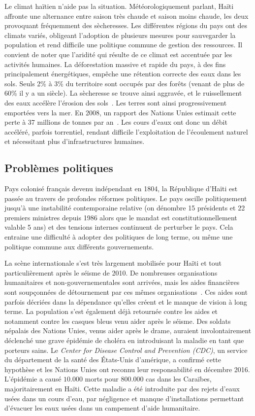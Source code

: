 \documentclass{eplmastersthesis_FR}
\begin{document}
				Le climat haïtien n'aide pas la situation. Météorologiquement parlant, Haïti affronte une alternance entre saison très chaude et saison moins chaude, les deux provoquant fréquemment des sècheresses. Les différentes régions du pays ont des climats variés, obligeant l'adoption de plusieurs mesures pour sauvegarder la population et rend difficile une politique commune de gestion des ressources. Il convient de noter que l'aridité qui résulte de ce climat est accentuée par les activités humaines. La déforestation massive et rapide du pays, à des fins principalement énergétiques, empêche une rétention correcte des eaux dans les sols. Seuls 2\% à 3\% du territoire sont occupés par des forêts (venant de plus de 60\% il y a un siècle). La sècheresse se trouve ainsi aggravée, et le ruissellement des eaux accélère l'érosion des sols~\cite{ref:desertification_of_haiti}. Les terres sont ainsi progressivement emportées vers la mer. En 2008, un rapport des Nations Unies estimait cette perte à 37 millions de tonnes par an~\cite{ref:impact_degradation_terre}. Les cours d'eaux ont donc un débit accéléré, parfois torrentiel, rendant difficile l'exploitation de l'écoulement naturel et nécessitant plus d'infrastructures humaines.

			\subsection*{Problèmes politiques}

				Pays colonisé français devenu indépendant en 1804, la République d'Haïti est passée au travers de profondes réformes politiques. Le pays oscille politiquement jusqu'à une instabilité contemporaine relative (on dénombre 15 présidents et 22 premiers ministres depuis 1986 alors que le mandat est constitutionnellement valable 5 ans) et des tensions internes continuent de perturber le pays. Cela entraine une difficulté à adopter des politiques de long terme, ou même une politique commune aux différents gouvernements.


				La scène internationale s'est très largement mobilisée pour Haïti et tout particulièrement après le séisme de 2010. De nombreuses organisations humanitaires et non-gouvernementales sont arrivées, mais les aides financières sont soupçonnées de détournement par ces mêmes organisations~\cite{ref:analyse_contextuelle_commune}. Ces aides sont parfois décriées dans la dépendance qu'elles créent et le manque de vision à long terme. La population s'est également déjà retournée contre les aides et notamment contre les casques bleus venu aider après le séisme. Des soldats népalais des Nations Unies, venus aider après le drame, auraient involontairement déclenché une grave épidémie de choléra en introduisant la maladie en tant que porteurs sains. Le \emph{Center for Disease Control and Prevention (CDC)}, un service du département de la santé des \'Etats-Unis d'amérique, a confirmé cette hypothèse et les Nations Unies ont reconnu leur responsabilité en décembre 2016. L'épidémie a causé $10.000$ morts pour $800.000$ cas dans les Caraïbes, majoritairement en Haïti. Cette maladie a été introduite par des rejets d'eaux usées dans un cours d'eau, par négligence et manque d'installations permettant d'évacuer les eaux usées dans un campement d'aide humanitaire.
\end{document}
